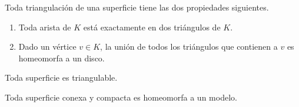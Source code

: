 \documentclass[GTSResumen.tex]{subfiles}
\begin{document}
\begin{prop}\label{534}
Toda triangulación de una superficie tiene las dos  propiedades siguientes.
\begin{enumerate}
\item Toda arista de $K$ está exactamente en dos triángulos de $K$.
\item Dado un vértice $v\in K$, la unión de todos los triángulos que contienen a $v$ es homeomorfa a un disco.


\end{enumerate}
\end{prop}

\begin{teorema}
Toda superficie es triangulable.
\end{teorema}

\begin{teorema}
Toda superficie conexa y compacta es homeomorfa a un modelo.
\end{teorema}
\end{document}
